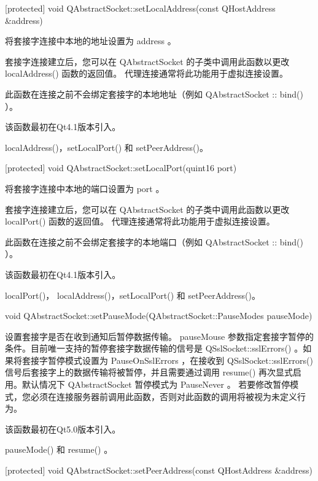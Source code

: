 [protected] void QAbstractSocket::setLocalAddress(const QHostAddress
\&address)

将套接字连接中本地的地址设置为 address 。

套接字连接建立后，您可以在 QAbstractSocket 的子类中调用此函数以更改 localAddress() 函数的返回值。 代理连接通常将此功能用于虚拟连接设置。

\begin{notice}
此函数在连接之前不会绑定套接字的本地地址（例如 QAbstractSocket :: bind() ）。
\end{notice}

该函数最初在Qt4.1版本引入。


\begin{seeAlso}
 localAddress()，setLocalPort() 和 setPeerAddress()。
\end{seeAlso}

[protected] void QAbstractSocket::setLocalPort(quint16 port)

将套接字连接中本地的端口设置为 port 。

套接字连接建立后，您可以在 QAbstractSocket 的子类中调用此函数以更改 localPort() 函数的返回值。 代理连接通常将此功能用于虚拟连接设置。

\begin{notice}
此函数在连接之前不会绑定套接字的本地端口（例如 QAbstractSocket :: bind() ）。
\end{notice}

该函数最初在Qt4.1版本引入。

\begin{seeAlso}
localPort()， localAddress()，setLocalPort() 和  setPeerAddress()。
\end{seeAlso}

void QAbstractSocket::setPauseMode(QAbstractSocket::PauseModes
pauseMode)

设置套接字是否在收到通知后暂停数据传输。 pauseMouse 参数指定套接字暂停的条件。目前唯一支持的暂停套接字数据传输的信号是 QSslSocket::sslErrors() 。如果将套接字暂停模式设置为 PauseOnSslErrors ，在接收到 QSslSocket::sslErrors() 信号后套接字上的数据传输将被暂停，并且需要通过调用 resume() 再次显式启用。默认情况下 QAbstractSocket 暂停模式为 PauseNever 。 若要修改暂停模式，您必须在连接服务器前调用此函数，否则对此函数的调用将被视为未定义行为。

该函数最初在Qt5.0版本引入。


\begin{seeAlso}
pauseMode() 和 resume() 。
\end{seeAlso}

[protected] void QAbstractSocket::setPeerAddress(const QHostAddress
\&address)


